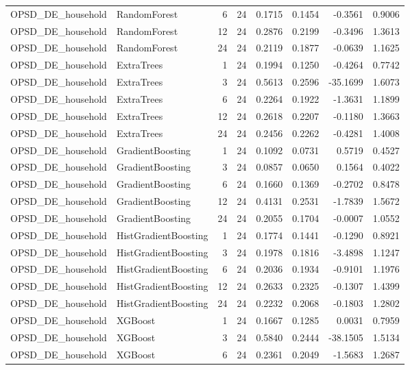 \begin{tabular}{llrrrrrr}
OPSD_DE_household & RandomForest & 6 & 24 & 0.1715 & 0.1454 & -0.3561 & 0.9006 \\
OPSD_DE_household & RandomForest & 12 & 24 & 0.2876 & 0.2199 & -0.3496 & 1.3613 \\
OPSD_DE_household & RandomForest & 24 & 24 & 0.2119 & 0.1877 & -0.0639 & 1.1625 \\
OPSD_DE_household & ExtraTrees & 1 & 24 & 0.1994 & 0.1250 & -0.4264 & 0.7742 \\
OPSD_DE_household & ExtraTrees & 3 & 24 & 0.5613 & 0.2596 & -35.1699 & 1.6073 \\
OPSD_DE_household & ExtraTrees & 6 & 24 & 0.2264 & 0.1922 & -1.3631 & 1.1899 \\
OPSD_DE_household & ExtraTrees & 12 & 24 & 0.2618 & 0.2207 & -0.1180 & 1.3663 \\
OPSD_DE_household & ExtraTrees & 24 & 24 & 0.2456 & 0.2262 & -0.4281 & 1.4008 \\
OPSD_DE_household & GradientBoosting & 1 & 24 & 0.1092 & 0.0731 & 0.5719 & 0.4527 \\
OPSD_DE_household & GradientBoosting & 3 & 24 & 0.0857 & 0.0650 & 0.1564 & 0.4022 \\
OPSD_DE_household & GradientBoosting & 6 & 24 & 0.1660 & 0.1369 & -0.2702 & 0.8478 \\
OPSD_DE_household & GradientBoosting & 12 & 24 & 0.4131 & 0.2531 & -1.7839 & 1.5672 \\
OPSD_DE_household & GradientBoosting & 24 & 24 & 0.2055 & 0.1704 & -0.0007 & 1.0552 \\
OPSD_DE_household & HistGradientBoosting & 1 & 24 & 0.1774 & 0.1441 & -0.1290 & 0.8921 \\
OPSD_DE_household & HistGradientBoosting & 3 & 24 & 0.1978 & 0.1816 & -3.4898 & 1.1247 \\
OPSD_DE_household & HistGradientBoosting & 6 & 24 & 0.2036 & 0.1934 & -0.9101 & 1.1976 \\
OPSD_DE_household & HistGradientBoosting & 12 & 24 & 0.2633 & 0.2325 & -0.1307 & 1.4399 \\
OPSD_DE_household & HistGradientBoosting & 24 & 24 & 0.2232 & 0.2068 & -0.1803 & 1.2802 \\
OPSD_DE_household & XGBoost & 1 & 24 & 0.1667 & 0.1285 & 0.0031 & 0.7959 \\
OPSD_DE_household & XGBoost & 3 & 24 & 0.5840 & 0.2444 & -38.1505 & 1.5134 \\
OPSD_DE_household & XGBoost & 6 & 24 & 0.2361 & 0.2049 & -1.5683 & 1.2687 \\

\end{tabular}
